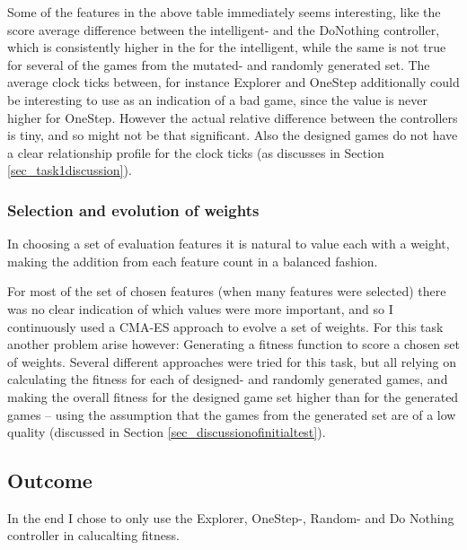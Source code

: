 \documentclass[a4paper,titlepage,final]{report}
\begin{document}
Some of the features in the above table immediately seems interesting, like the score average difference between the intelligent- and the DoNothing controller, which is consistently higher in the for the intelligent, while the same is not true for several of the games from the mutated- and randomly generated set.
The average clock ticks between, for instance Explorer and OneStep additionally could be interesting to use as an indication of a bad game, since the value is never higher for OneStep.
However the actual relative difference between the controllers is tiny, and so might not be that significant. 
Also the designed games do not have a clear relationship profile for the clock ticks (as discusses in Section \ref{sec_task1discussion}).



\subsubsection*{Selection and evolution of weights}
In choosing a set of evaluation features it is natural to value each with a weight, making the addition from each feature count in a balanced fashion.

For most of the set of chosen features (when many features were selected) there was no clear indication of which values were more important, and so I continuously used a CMA-ES approach to evolve a set of weights.
For this task another problem arise however: Generating a fitness function to score a chosen set of weights.
Several different approaches were tried for this task, but all relying on calculating the fitness for each of designed- and randomly generated games, and making the overall fitness for the designed game set higher than for the generated games -- using the assumption that the games from the generated set are of a low quality (discussed in Section \ref{sec_discussionofinitialtest}).




\subsection{Outcome}

In the end I chose to only use the Explorer, OneStep-, Random- and Do Nothing controller in calucalting fitness.
\end{document}
